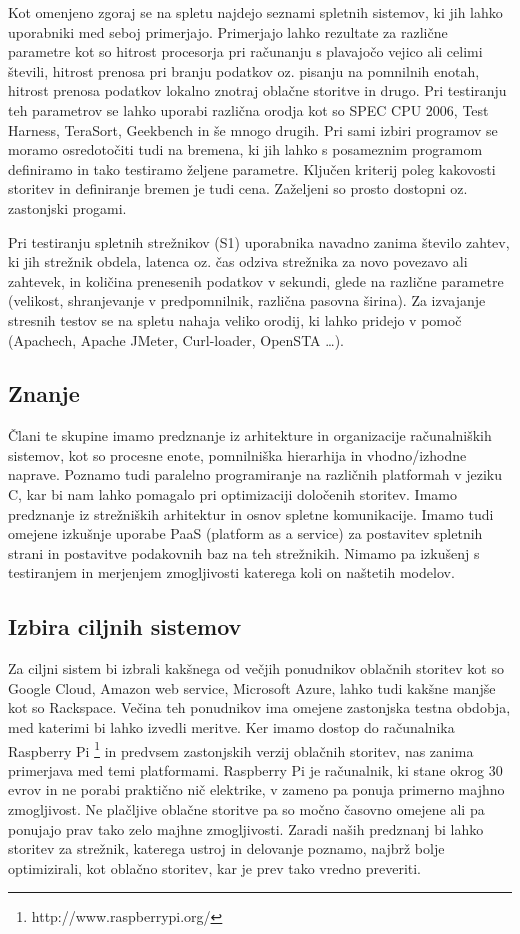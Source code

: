 \documentclass[11pt]{article}
\begin{document}
Kot omenjeno zgoraj se na spletu najdejo seznami spletnih sistemov, ki jih lahko uporabniki med seboj primerjajo. Primerjajo lahko rezultate za različne parametre kot so hitrost procesorja pri računanju s plavajočo vejico ali celimi števili, hitrost prenosa pri branju podatkov oz. pisanju na pomnilnih enotah, hitrost prenosa podatkov lokalno znotraj oblačne storitve in drugo. Pri testiranju teh parametrov se lahko uporabi različna orodja kot so SPEC CPU 2006, Test Harness, TeraSort, Geekbench in še mnogo drugih. Pri sami izbiri programov se moramo osredotočiti tudi na bremena, ki jih lahko s posameznim programom definiramo in tako testiramo željene parametre. Ključen kriterij poleg kakovosti storitev in definiranje bremen je tudi cena. Zaželjeni so prosto dostopni oz. zastonjski progami. 

Pri testiranju spletnih strežnikov (S1) uporabnika navadno  zanima število zahtev, ki jih strežnik obdela, latenca oz. čas odziva strežnika za novo povezavo ali zahtevek, in količina prenesenih podatkov v sekundi, glede na različne parametre (velikost, shranjevanje v predpomnilnik, različna pasovna širina). Za izvajanje stresnih testov se na spletu nahaja veliko orodij, ki lahko pridejo v pomoč (Apachech, Apache JMeter, Curl-loader, OpenSTA …). 

\subsection{Znanje}
Člani te skupine imamo predznanje iz arhitekture in organizacije računalniških sistemov, kot so procesne enote, pomnilniška hierarhija in vhodno/izhodne naprave. Poznamo tudi paralelno programiranje na različnih platformah v jeziku C, kar bi nam lahko pomagalo pri optimizaciji določenih storitev. Imamo predznanje iz strežniških arhitektur in osnov spletne komunikacije. Imamo tudi omejene izkušnje uporabe PaaS (platform as a service) za postavitev spletnih strani in postavitve podakovnih baz na teh strežnikih. Nimamo pa izkušenj s testiranjem in merjenjem zmogljivosti katerega koli on naštetih modelov.

\subsection{Izbira ciljnih sistemov}
Za ciljni sistem bi izbrali kakšnega od večjih ponudnikov oblačnih storitev kot so Google Cloud, Amazon web service, Microsoft Azure, lahko tudi kakšne manjše kot so Rackspace. Večina teh ponudnikov ima omejene zastonjska testna obdobja, med katerimi bi lahko izvedli meritve.
Ker imamo dostop do računalnika Raspberry Pi \footnote{http://www.raspberrypi.org/} in predvsem zastonjskih verzij oblačnih storitev, nas zanima primerjava med temi platformami. Raspberry Pi je računalnik, ki stane okrog 30 evrov in ne porabi praktično nič elektrike, v zameno pa ponuja primerno majhno zmogljivost. Ne plačljive oblačne storitve pa so močno časovno omejene ali pa ponujajo prav tako zelo majhne zmogljivosti.
Zaradi naših predznanj bi lahko storitev za strežnik, katerega ustroj in delovanje poznamo, najbrž bolje optimizirali, kot oblačno storitev, kar je prev tako vredno preveriti.
\end{document}
